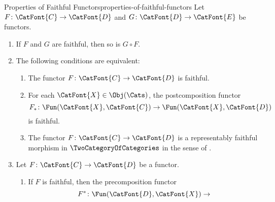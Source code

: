 \begin{proposition}{Properties of Faithful Functors}{properties-of-faithful-functors}%
    Let $F\colon\CatFont{C}\to\CatFont{D}$ and $G\colon\CatFont{D}\to\CatFont{E}$ be functors.
    \begin{enumerate}
        \item\label{properties-of-faithful-functors-interaction-with-composition}If $F$ and $G$ are faithful, then so is $G\circ F$.
        \item\label{properties-of-faithful-functors-interaction-with-postcomposition}The following conditions are equivalent:
            \begin{enumerate}
                \item\label{properties-of-faithful-functors-interaction-with-postcomposition-a}The functor $F\colon\CatFont{C}\to\CatFont{D}$ is faithful.
                \item\label{properties-of-faithful-functors-interaction-with-postcomposition-b}For each $\CatFont{X}\in\Obj(\Cats)$, the postcomposition functor
                    \[
                        F_{*}
                        \colon
                        \Fun(\CatFont{X},\CatFont{C})
                        \to
                        \Fun(\CatFont{X},\CatFont{D})
                    \]%
                    is faithful.
                \item\label{properties-of-faithful-functors-interaction-with-postcomposition-c}The functor $F\colon\CatFont{C}\to\CatFont{D}$ is a representably faithful morphism in $\TwoCategoryOfCategories$ in the sense of .
            \end{enumerate}
        \item\label{properties-of-faithful-functors-interaction-with-precomposition-1}Let $F\colon\CatFont{C}\to\CatFont{D}$ be a functor.
            \begin{enumerate}
                \item\label{properties-of-faithful-functors-interaction-with-precomposition-1-a}If $F$ is faithful, then the precomposition functor
                    \[
                        F^{*}
                        \colon
                        \Fun(\CatFont{D},\CatFont{X})
                        \to
\]
\end{enumerate}
\end{enumerate}
\end{proposition}
